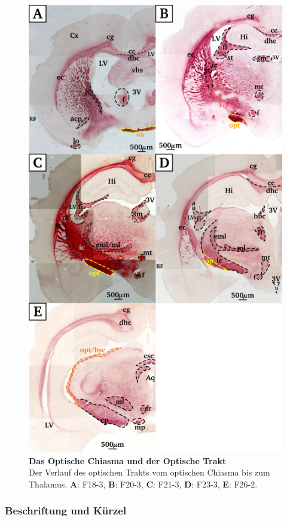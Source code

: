 \documentclass[12pt,a4paper,pdftex]{article}
\begin{document}
\begin{figure}[H]
    \centering
    \includegraphics{pictures/visual/optic_tract.png}
    \caption[Das Optische Chiasma und der Optische Trakt]{\textbf{Das Optische Chiasma und der Optische Trakt}\\
    Der Verlauf des optischen Trakts vom optischen Chiasma bis zum Thalamus. \textbf{A}: F18-3, \textbf{B}: F20-3, \textbf{C}: F21-3, \textbf{D}: F23-3, \textbf{E}: F26-2.}
    \label{fig:optic_tract}
\end{figure}

\subsubsection*{Beschriftung und Kürzel}
\end{document}
